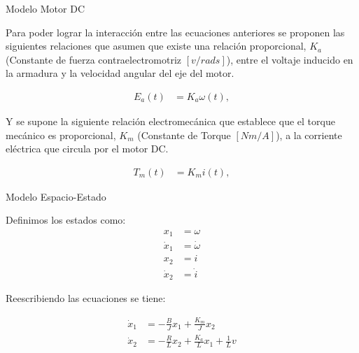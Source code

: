 \documentclass{beamer}
\begin{document}
\begin{frame}{Modelo Motor DC}
\begin{justify}
\vspace{0.3cm}
\begin{itemize}  
Para poder lograr la interacción entre las ecuaciones anteriores se proponen las siguientes relaciones que asumen que existe una relación proporcional, $K_a$ (Constante de fuerza contraelectromotriz $[v/rad s]$), entre el voltaje inducido en la armadura y la velocidad angular del eje del motor.

\begin{align}
E_a(t) &= K_a\omega(t),
\end{align}

Y se supone la siguiente relación electromecánica que establece que el torque mecánico es proporcional, $K_m$ (Constante de Torque $[Nm / A]$), a la corriente eléctrica que circula por el motor DC.

\begin{align}
T_m(t) &= K_m i(t),
\end{align}

\end{itemize}
\end{justify}
\end{frame}

\begin{frame}{Modelo Espacio-Estado}
\begin{justify}
\vspace{0.3cm}
\begin{itemize}  
   Definimos los estados como:
    \begin{align}
        x_1&=\omega \\
        \dot{x}_1&=\dot{\omega} \\
        x_2&=i \\
        \dot{x}_2&=\dot{i} 
    \end{align}

Reescribiendo las ecuaciones se tiene:

\begin{align}
    \dot{x}_1&=-\frac{B}{J}x_1+\frac{K_m}{J}x_2 \\
    \dot{x}_2&=-\frac{R}{L}x_2+\frac{K_a}{L}x_1+\frac{1}{L}v
\end{align}
\end{itemize}
\end{justify}
\end{frame}
\end{document}
